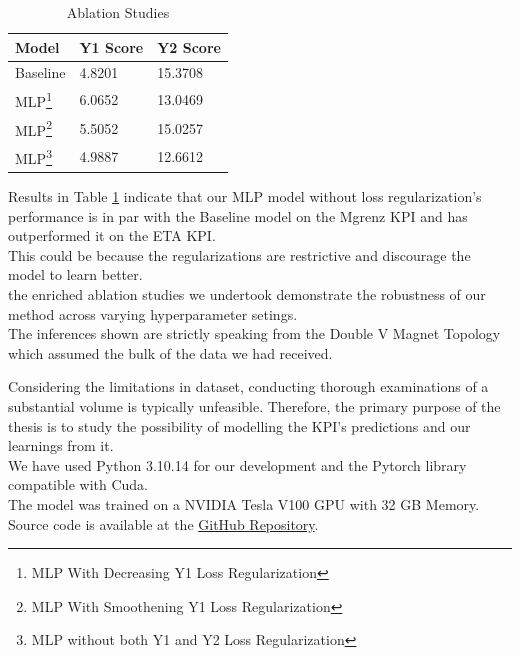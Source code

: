 \documentclass{report} %
\begin{document}
\begin{minipage}[t]{\textwidth}
    \begin{table}[H]
        \centering
        \begin{tabular}{|p{}|p{}|p{}|}
        \hline {\bf Model} & {\bf Y1 Score} & {\bf Y2 Score}\\
        \hline 
        Baseline & 4.8201 & 15.3708 \\
        MLP\footnote{MLP With Decreasing Y1 Loss Regularization} & 6.0652 & 13.0469 \\
        MLP\footnote{MLP With Smoothening Y1 Loss Regularization} & 5.5052 & 15.0257 \\
        MLP\footnote{MLP without both Y1 and Y2 Loss Regularization} & 4.9887 & 12.6612  \\
        \hline
        \end{tabular}
        \caption{Ablation Studies}
        \label{tab:Ablation Studies}
    \end{table}
\end{minipage}

\vspace{1em} %

Results in Table \ref{tab:Ablation Studies} indicate that our \ac{MLP} model without loss regularization's performance is in par with the Baseline model on the Mgrenz \ac{KPI} and has outperformed it on the ETA \ac{KPI}.\\
This could be because the regularizations are restrictive and discourage the model to learn better.\\
the enriched ablation studies we undertook demonstrate the robustness of our method across varying hyperparameter setings.\\
The inferences shown are strictly speaking from the Double V Magnet Topology which assumed the bulk of the data we had received.

Considering the limitations in dataset, conducting thorough examinations of a substantial volume is typically unfeasible. Therefore, the primary purpose of the thesis is to study the possibility of modelling the \ac{KPI}'s predictions and our learnings from it.\\

We have used Python 3.10.14 for our development and the Pytorch library compatible with Cuda.\\
The model was trained on a NVIDIA Tesla V100 \ac{GPU} with 32 GB Memory.\\
Source code is available at the \href{https://github.com/Lilly-25/Masters-Thesis}{GitHub Repository}.
\end{document}
